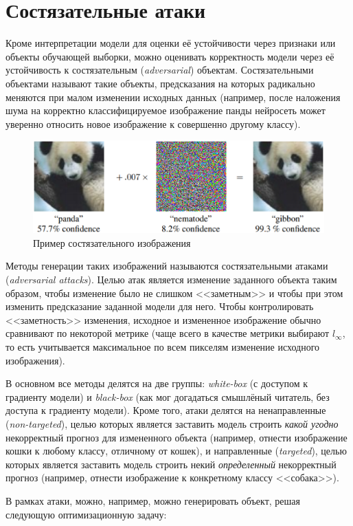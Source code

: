 \documentclass[12pt,a4paper]{article}
\begin{document}
\section{Состязательные атаки}

Кроме интерпретации модели для оценки её устойчивости через признаки или объекты обучающей выборки, можно оценивать корректность модели через её устойчивость к состязательным (\emph{adversarial}) объектам. Состязательными объектами называют такие объекты, предсказания на которых радикально меняются при малом изменении исходных данных (например, после наложения шума на корректно классифицируемое изображение панды нейросеть может уверенно относить новое изображение к совершенно другому классу).

\begin{center}
	\begin{figure}[!htb]
		\centering
		\includegraphics[width=0.9\linewidth]{adversarial_attack.eps}
		\caption{Пример состязательного изображения}
	\end{figure}
\end{center}


\par Методы генерации таких изображений называются состязательными атаками (\emph{adversarial attacks}). Целью атак является изменение заданного объекта таким образом, чтобы изменение было не слишком <<заметным>> и чтобы при этом изменить предсказание заданной модели для него. Чтобы контролировать <<заметность>> изменения, исходное и измененное изображение обычно сравнивают по некоторой метрике (чаще всего в качестве метрики выбирают $l_{\infty}$, то есть учитывается максимальное по всем пикселям изменение исходного изображения).
\par В основном все методы делятся на две группы: \emph{white-box} (с доступом к градиенту модели) и \emph{black-box} (как мог догадаться смышлёный читатель, без доступа к градиенту модели). Кроме того, атаки делятся на ненаправленные (\emph{non-targeted}), целью которых является заставить модель строить \emph{какой угодно} некорректный прогноз для измененного объекта (например, отнести изображение кошки к любому классу, отличному от кошек), и направленные (\emph{targeted}), целью которых является заставить модель строить некий \emph{определенный} некорректный прогноз (например, отнести изображение к конкретному классу <<собака>>).
\newpage
\par В рамках атаки, можно, например, можно генерировать объект, решая следующую оптимизационную задачу:
\end{document}
